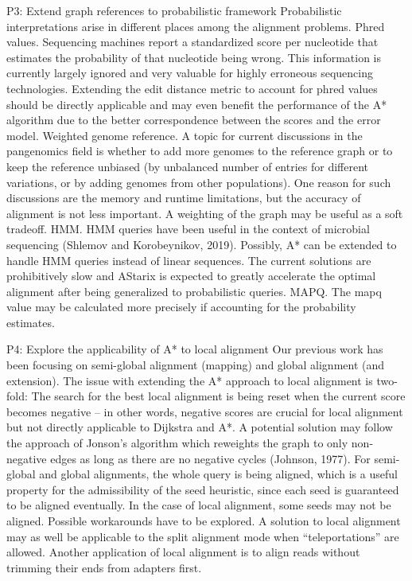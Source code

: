 P3: Extend graph references to probabilistic framework
Probabilistic interpretations arise in different places among the alignment problems.
Phred values. Sequencing machines report a standardized score per nucleotide that estimates the probability of that nucleotide being wrong. This information is currently largely ignored and very valuable for highly erroneous sequencing technologies. Extending the edit distance metric to account for phred values should be directly applicable and may even benefit the performance of the A* algorithm due to the better correspondence between the scores and the error model.
Weighted genome reference. A topic for current discussions in the pangenomics field is whether to add more genomes to the reference graph or to keep the reference unbiased (by unbalanced number of entries for different variations, or by adding genomes from other populations). One reason for such discussions are the memory and runtime limitations, but the accuracy of alignment is not less important. A weighting of the graph may be useful as a soft tradeoff.
HMM. HMM queries have been useful in the context of microbial sequencing (Shlemov and Korobeynikov, 2019). Possibly, A* can be extended to handle HMM queries instead of linear sequences. The current solutions are prohibitively slow and AStarix is expected to greatly accelerate the optimal alignment after being generalized to probabilistic queries.
MAPQ. The mapq value may be calculated more precisely if accounting for the probability estimates.

P4: Explore the applicability of A* to local alignment
Our previous work has been focusing on semi-global alignment (mapping) and global alignment (and extension). The issue with extending the A* approach to local alignment is two-fold:
The search for the best local alignment is being reset when the current score becomes negative – in other words, negative scores are crucial for local alignment but not directly applicable to Dijkstra and A*. A potential solution may follow the approach of Jonson’s algorithm which reweights the graph to only non-negative edges as long as there are no negative cycles (Johnson, 1977). 
For semi-global and global alignments, the whole query is being aligned, which is a useful property for the admissibility of the seed heuristic, since each seed is guaranteed to be aligned eventually. In the case of local alignment, some seeds may not be aligned. Possible workarounds have to be explored.
A solution to local alignment may as well be applicable to the split alignment mode when “teleportations” are allowed. Another application of local alignment is to align reads without trimming their ends from adapters first.

